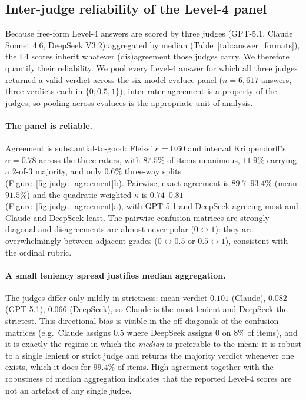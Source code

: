 \subsection{Inter-judge reliability of the Level-4 panel}
\label{app:judge_reliability}

Because free-form Level-4 answers are scored by three judges (GPT-5.1, Claude Sonnet 4.6, DeepSeek V3.2) aggregated by median (Table~\ref{tab:answer_formats}), the L4 scores inherit whatever (dis)agreement those judges carry. We therefore quantify their reliability. We pool every Level-4 answer for which all three judges returned a valid verdict across the six-model evaluee panel ($n{=}6{,}617$ answers, three verdicts each in $\{0,0.5,1\}$); inter-rater agreement is a property of the judges, so pooling across evaluees is the appropriate unit of analysis.

\paragraph{The panel is reliable.} Agreement is substantial-to-good: Fleiss' $\kappa=0.60$ and interval Krippendorff's $\alpha=0.78$ across the three raters, with $87.5\%$ of items unanimous, $11.9\%$ carrying a $2$-of-$3$ majority, and only $0.6\%$ three-way splits (Figure~\ref{fig:judge_agreement}b). Pairwise, exact agreement is $89.7$--$93.4\%$ (mean $91.5\%$) and the quadratic-weighted $\kappa$ is $0.74$--$0.81$ (Figure~\ref{fig:judge_agreement}a), with GPT-5.1 and DeepSeek agreeing most and Claude and DeepSeek least. The pairwise confusion matrices are strongly diagonal and disagreements are almost never polar ($0\leftrightarrow1$): they are overwhelmingly between adjacent grades ($0\leftrightarrow0.5$ or $0.5\leftrightarrow1$), consistent with the ordinal rubric.

\paragraph{A small leniency spread justifies median aggregation.} The judges differ only mildly in strictness: mean verdict $0.101$ (Claude), $0.082$ (GPT-5.1), $0.066$ (DeepSeek), so Claude is the most lenient and DeepSeek the strictest. This directional bias is visible in the off-diagonals of the confusion matrices (e.g.\ Claude assigns $0.5$ where DeepSeek assigns $0$ on $8\%$ of items), and it is exactly the regime in which the \emph{median} is preferable to the mean: it is robust to a single lenient or strict judge and returns the majority verdict whenever one exists, which it does for $99.4\%$ of items. High agreement together with the robustness of median aggregation indicates that the reported Level-4 scores are not an artefact of any single judge.

